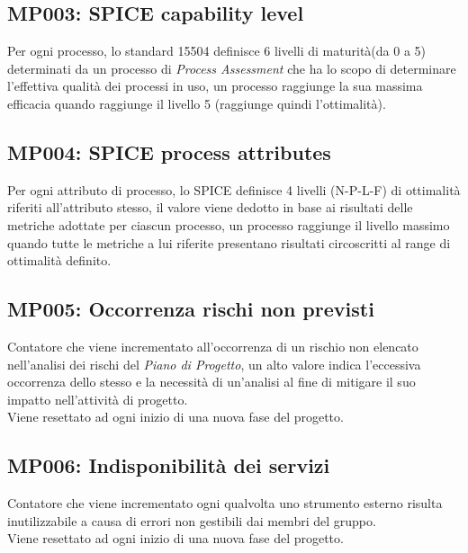 \subsection{MP003: SPICE capability level}
Per ogni processo, lo standard 15504 definisce 6 livelli di maturità(da 0 a 5) determinati da un processo di  \textit{Process Assessment} che ha lo scopo di determinare l'effettiva qualità dei processi in uso, un processo raggiunge la sua massima efficacia quando raggiunge il livello 5 (raggiunge quindi l'ottimalità).

\subsection{MP004: SPICE process attributes}
Per ogni attributo di processo, lo SPICE definisce 4 livelli (N-P-L-F) di ottimalità riferiti all'attributo stesso, il valore viene dedotto in base ai risultati delle metriche adottate per ciascun processo, un processo raggiunge il livello massimo quando tutte le metriche a lui riferite presentano risultati circoscritti al range di ottimalità definito.

\subsection{MP005: Occorrenza rischi non previsti}
Contatore che viene incrementato all'occorrenza di un rischio non elencato nell'analisi dei rischi del \textit{Piano di Progetto}, un alto valore indica l'eccessiva occorrenza dello stesso e la necessità di un'analisi al fine di mitigare il suo impatto nell'attività di progetto.\\
Viene resettato ad ogni inizio di una nuova fase del progetto.

\subsection{MP006: Indisponibilità dei servizi}
Contatore che viene incrementato ogni qualvolta uno strumento esterno risulta inutilizzabile a causa di errori non gestibili dai membri del gruppo.\\
Viene resettato ad ogni inizio di una nuova fase del progetto.

